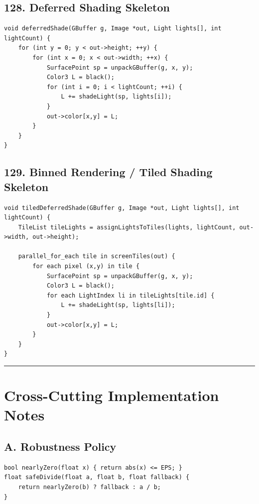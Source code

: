 \documentclass[10pt,letterpaper]{article}
\begin{document}
\subsection{128. Deferred Shading Skeleton}

\begin{verbatim}
void deferredShade(GBuffer g, Image *out, Light lights[], int lightCount) {
    for (int y = 0; y < out->height; ++y) {
        for (int x = 0; x < out->width; ++x) {
            SurfacePoint sp = unpackGBuffer(g, x, y);
            Color3 L = black();
            for (int i = 0; i < lightCount; ++i) {
                L += shadeLight(sp, lights[i]);
            }
            out->color[x,y] = L;
        }
    }
}
\end{verbatim}

\subsection{129. Binned Rendering / Tiled Shading Skeleton}

\begin{verbatim}
void tiledDeferredShade(GBuffer g, Image *out, Light lights[], int lightCount) {
    TileList tileLights = assignLightsToTiles(lights, lightCount, out->width, out->height);

    parallel_for_each tile in screenTiles(out) {
        for each pixel (x,y) in tile {
            SurfacePoint sp = unpackGBuffer(g, x, y);
            Color3 L = black();
            for each LightIndex li in tileLights[tile.id] {
                L += shadeLight(sp, lights[li]);
            }
            out->color[x,y] = L;
        }
    }
}
\end{verbatim}

\medskip\hrule\medskip

\section{Cross-Cutting Implementation Notes}

\subsection{A. Robustness Policy}

\begin{verbatim}
bool nearlyZero(float x) { return abs(x) <= EPS; }
float safeDivide(float a, float b, float fallback) {
    return nearlyZero(b) ? fallback : a / b;
}
\end{verbatim}
\end{document}
